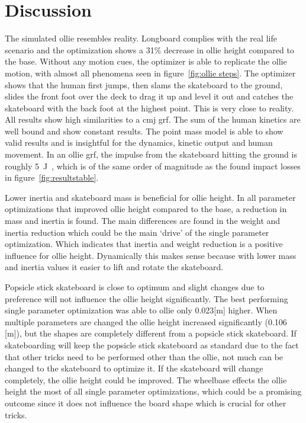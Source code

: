 \documentclass[default,iicol]{sn-jnl}
\begin{document}
\section{Discussion}
The simulated ollie resembles reality. Longboard complies with the real life scenario and the optimization shows a 31\% decrease in ollie height compared to the base. Without any motion cues, the optimizer is able to replicate the ollie motion, with almost all phenomena seen in figure~\ref{fig:ollie steps}. The optimizer shows that the human first jumps, then slams the skateboard to the ground, slides the front foot over the deck to drag it up and level it out and catches the skateboard with the back foot at the highest point. This is very close to reality. All results show high similarities to a \gls{cmj} \gls{grf}. The sum of the human kinetics are well bound and show constant results. The point mass model is able to show valid results and is insightful for the dynamics, kinetic output and human movement. In an ollie \gls{grf}, the impulse from the skateboard hitting the ground is roughly \SI{5}{\joule}~\cite{determan_kinetics_2006}, which is of the same order of magnitude as the found impact losses in figure~\ref{fig:resultstable}.

Lower inertia and skateboard mass is beneficial for ollie height. In all parameter optimizations that improved ollie height compared to the base, a reduction in mass and inertia is found. The main differences are found in the weight and inertia reduction which could be the main `drive' of the single parameter optimization. Which indicates that inertia and weight reduction is a positive influence for ollie height. Dynamically this makes sense because with lower mass and inertia values it easier to lift and rotate the skateboard.

Popsicle stick skateboard is close to optimum and slight changes due to preference will not influence the ollie height significantly. The best performing single parameter optimization was able to ollie only 0.023[m] higher. When multiple parameters are changed the ollie height increased significantly (0.106 [m]), but the shapes are completely different from a popsicle stick skateboard. If skateboarding will keep the popsicle stick skateboard as standard due to the fact that other tricks need to be performed other than the ollie, not much can be changed to the skateboard to optimize it. If the skateboard will change completely, the ollie height could be improved. The wheelbase effects the ollie height the most of all single parameter optimizations, which could be a promising outcome since it does not influence the board shape which is crucial for other tricks.
\end{document}
